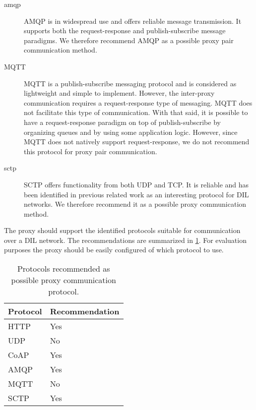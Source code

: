 \begin{description}
	\item[\gls{amqp}] AMQP is in widespread use and offers reliable message
	transmission. It supports both the request-response and publish-subscribe
	message paradigms. We therefore recommend AMQP as a possible proxy pair
	communication method.

	\item[MQTT] MQTT is a publish-subscribe messaging protocol and is considered
	as lightweight and simple to implement. However, the inter-proxy
	communication requires a request-response type of messaging. MQTT does not
	facilitate this type of communication. With that said, it is possible to
	have a request-response paradigm on top of publish-subscribe by organizing
	queues and by using some application logic. However, since MQTT does not
	natively support request-response, we do not recommend this protocol for
	proxy pair communication.

	\item[\gls{sctp}] SCTP offers functionality from both UDP and TCP. It is
	reliable and has been identified in previous related work as an interesting
	protocol for DIL networks. We therefore recommend it as a possible proxy
	communication method.

\end{description}

The proxy should support the identified protocols suitable for communication
over a DIL network. The recommendations are summarized in
\cref{table:possible-proxy-protocols}. For evaluation purposes the proxy should be
easily configured of which protocol to use.

\begin{table}[h]
\begin{tabularx}{\textwidth}{| X | X |}
\hline
  \textbf{Protocol} & \textbf{Recommendation} \\ \hline
  HTTP & Yes \\ \hline
  UDP & No \\ \hline
  CoAP & Yes \\ \hline
  AMQP & Yes \\ \hline
  MQTT & No \\ \hline
  SCTP & Yes \\ \hline
\end{tabularx}
\caption{Protocols recommended as possible proxy communication protocol.}
\label{table:possible-proxy-protocols}
\end{table}



